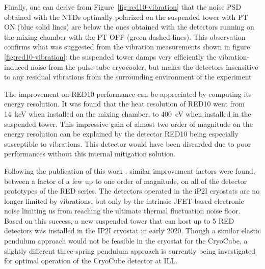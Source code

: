 Finally, one can derive from Figure~\ref{fig:red10-vibration} that the noise PSD obtained with the NTDs optimally polarized on the suspended tower with PT ON (blue solid lines) are below the ones obtained with the detectors running on the mixing chamber with the PT OFF (green dashed lines). This observation confirms what was suggested from the vibration measurements shown in figure \ref{fig:red10-vibration}:  the suspended tower damps very efficiently the vibration-induced noise from the pulse-tube cryocooler, but makes the detectors insensitive to any residual vibrations from the surrounding environment of the experiment

The improvement on RED10 performance can be appreciated by computing its energy resolution. It was found that the heat resolution of RED10 went from \SI{14}{\kilo\eV} when installed on the mixing chamber, to \SI{400}{\eV}  when installed in the suspended tower. This impressive gain of almost two order of magnitude on the energy resolution can be explained by the detector RED10 being especially susceptible to vibrations. This detector would have been discarded due to poor performances without this internal mitigation solution.


Following the publication of this work \cite{Maisonobe:2018tbq}, similar improvement factors were found, between a factor of a few up to one order of magnitude, on all of the detector prototypes of the RED series.
The detectors operated in the iP2I cryostats are no longer limited by vibrations, but only by the intrinsic JFET-based electronic noise limiting us from reaching the ultimate thermal fluctuation noise floor.
Based on this success, a new suspended tower
that can host up to 5 RED detectors was installed in the IP2I cryostat in early 2020.  Though a similar elastic pendulum approach would not be feasible in the \Ricochet{} cryostat for the CryoCube, a slightly different three-spring pendulum approach is currently being investigated  for optimal operation of the CryoCube detector  at ILL.

